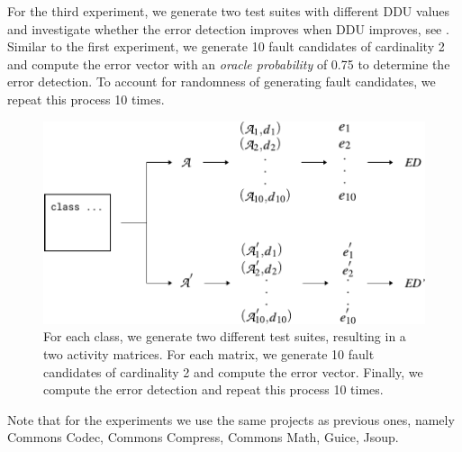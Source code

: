\documentclass[twoside,a4paper,11pt]{memoir}
\begin{document}
For the third experiment, we generate two test suites with different DDU values and investigate whether the error detection improves when DDU improves, see .
Similar to the first experiment, we generate 10 fault candidates of cardinality 2 and compute the error vector with an \emph{oracle probability} of 0.75 to determine the error detection.
To account for randomness of generating fault candidates, we repeat this process 10 times.
\begin{figure}
  \includegraphics[width=\linewidth]{figures/delta_error_detection_approach}
  \caption{For each class, we generate two different test suites, resulting in a two activity matrices. For each matrix, we generate 10 fault candidates of cardinality 2 and compute the error vector. Finally, we compute the error detection and repeat this process 10 times.}
  \label{fig:delta_error_detection_approach}
\end{figure}

Note that for the experiments we use the same projects as previous ones, namely Commons Codec, Commons Compress, Commons Math, Guice, Jsoup.
\end{document}
